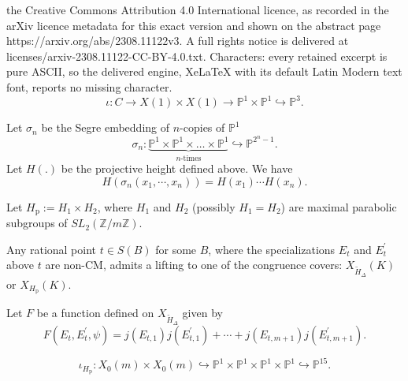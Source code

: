 \documentclass[10pt,a4paper]{amsart}
\newcommand{\Z}{\mathbb{Z}}
\renewcommand{\P}{\mathbb{P}}
\begin{document}
the Creative Commons Attribution 4.0 International licence, as recorded in the arXiv licence metadata for this exact version and shown on the abstract page https://arxiv.org/abs/2308.11122v3. A full rights notice is delivered at licenses/arxiv-2308.11122-CC-BY-4.0.txt. Characters: every retained excerpt is pure ASCII, so the delivered engine, XeLaTeX with its default Latin Modern text font, reports no missing character.
\begin{equation}\label{iota}
	\iota: C \rightarrow X(1) \times X(1)  \rightarrow \mathbb{P}^{1} \times \mathbb{P}^{1} \hookrightarrow \mathbb{P}^{3}.
	\end{equation}

\begin{lem}\label{ProductHeights}
Let $\sigma_{n}$ be the Segre embedding of $n$-copies of $\P^{1}$
$$\sigma_{n}\colon \underbrace{\P^{1} \times \P^{1} \times \ldots \times \P^{1}}_{n\text{-times}} \hookrightarrow \P^{2^{n}-1}.  $$  Let $H(.)$ be the projective height defined above. We have 
$$H(\sigma_{n}(x_1, \cdots, x_{n}))=H(x_{1})\cdots H(x_{n}).$$
	
\end{lem}

\begin{defn}\label{Hprod}
  Let $H_{\text{p}}:=H_{1} \times H_{2}$, where $H_{1}$ and $H_{2}$ (possibly $H_{1}=H_{2}$) are maximal parabolic subgroups of $SL_{2}(\Z/m\Z)$.
\end{defn}

\begin{lem}\label{covers}
	
	Any rational point $t \in S(B)$ for some $B$, where the specializations $E_t$ and $E^{\prime}_t$ above $t$ are non-CM, admits a lifting to one of the congruence covers: $X_{\tilde{H}_{\Delta}}(K)$ or $X_{H_{\text{p}}}(K)$.
\end{lem}

\begin{defn}\label{F}

	Let $F$ be a function defined on $X_{\tilde{H}_{\Delta}}$ given by
	$$F(E_{t}, E_{t}^{\prime}, \psi)=j(E_{t,1})j(E^{\prime}_{t,1})+ \cdots +j(E_{t, m+1})j(E^{\prime}_{t, m+1}).$$
	
	\end{defn}

\begin{equation}\label{iotaHp}
	\iota_{H_{\operatorname{p}}}: X_{0}(m) \times X_{0}(m) \hookrightarrow \P^{1} \times \P^{1} \times \P^{1} \times \P^{1} \hookrightarrow \P^{15}.
\end{equation}
\end{document}
